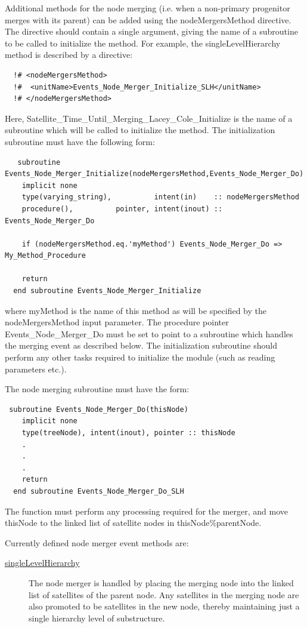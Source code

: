 Additional methods for the node merging (i.e. when a non-primary progenitor merges with its parent) can be added using the {\normalfont \ttfamily nodeMergersMethod} directive. The directive should contain a single argument, giving the name of a subroutine to be called to initialize the method. For example, the {\normalfont \ttfamily singleLevelHierarchy} method is described by a directive:
\begin{verbatim}
  !# <nodeMergersMethod>
  !#  <unitName>Events_Node_Merger_Initialize_SLH</unitName>
  !# </nodeMergersMethod>
\end{verbatim}
Here, {\normalfont \ttfamily Satellite\_Time\_Until\_Merging\_Lacey\_Cole\_Initialize} is the name of a subroutine which will be called to initialize the method. The initialization subroutine must have the following form:
\begin{verbatim}
   subroutine Events_Node_Merger_Initialize(nodeMergersMethod,Events_Node_Merger_Do)
    implicit none
    type(varying_string),          intent(in)    :: nodeMergersMethod
    procedure(),          pointer, intent(inout) :: Events_Node_Merger_Do

    if (nodeMergersMethod.eq.'myMethod') Events_Node_Merger_Do => My_Method_Procedure

    return
  end subroutine Events_Node_Merger_Initialize
\end{verbatim}
where {\normalfont \ttfamily myMethod} is the name of this method as will be specified by the {\normalfont \ttfamily nodeMergersMethod} input parameter. The procedure pointer {\normalfont \ttfamily Events\_Node\_Merger\_Do} must be set to point to a subroutine which handles the merging event as described below. The initialization subroutine should perform any other tasks required to initialize the module (such as reading parameters etc.).

The node merging subroutine must have the form:
\begin{verbatim}
 subroutine Events_Node_Merger_Do(thisNode)
    implicit none
    type(treeNode), intent(inout), pointer :: thisNode
    .
    .
    .
    return
  end subroutine Events_Node_Merger_Do_SLH
\end{verbatim}
The function must perform any processing required for the merger, and move {\normalfont \ttfamily thisNode} to the linked list of satellite nodes in {\normalfont \ttfamily thisNode\%parentNode}.

Currently defined node merger event methods are:
\begin{description}
 \item [\hyperlink{events.node_merger.single_level_hierarchy.F90:events_node_mergers_slh:events_node_merger_do_slh}{{\normalfont \ttfamily singleLevelHierarchy}}] The node merger is handled by placing the merging node into the linked list of satellites of the parent node. Any satellites in the merging node are also promoted to be satellites in the new node, thereby maintaining just a single hierarchy level of substructure.
\end{description}

